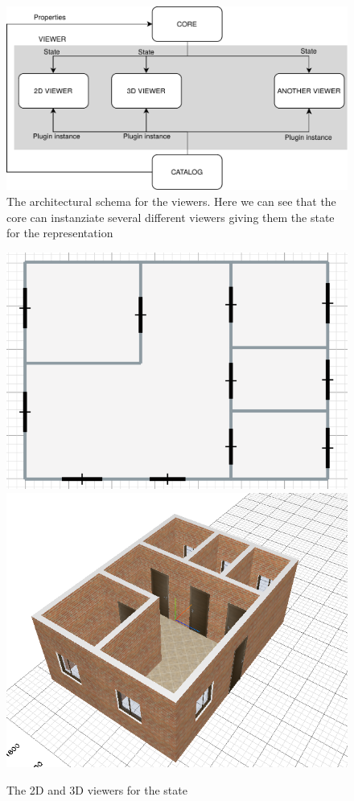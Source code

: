 \begin{figure}[htb]
\centering
\includegraphics[width=\linewidth]{contents/images/diagramma-visualizzatori}

\caption{The architectural schema for the viewers. Here we can see that the core can instanziate several different viewers giving them the state for the representation}
\label{fig_viewers}
\end{figure}

\begin{figure}[htb]
\centering
\includegraphics[width=0.45\linewidth]{contents/images/2d-viewer}
\includegraphics[width=0.45\linewidth]{contents/images/3d-viewer}
\caption{The 2D and 3D viewers for the state}
\label{fig_viewer}
\end{figure}

